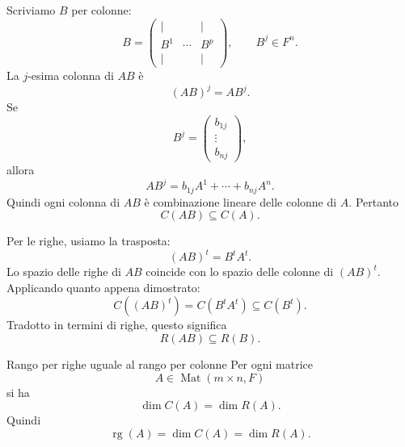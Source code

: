 \documentclass[a4paper]{article}
\begin{document}
\begin{snippetproof}{}
    Scriviamo \(B\) per colonne:
    \[
        B=
        \begin{pmatrix}
            \vert & & \vert\\
            B^1 & \cdots & B^p\\
            \vert & & \vert
        \end{pmatrix},
        \qquad
        B^j\in F^n.
    \]
    La \(j\)-esima colonna di \(AB\) è
    \[
        (AB)^j=A B^j.
    \]
    Se
    \[
        B^j=
        \begin{pmatrix}
            b_{1j}\\
            \vdots\\
            b_{nj}
        \end{pmatrix},
    \]
    allora
    \[
        AB^j
        =
        b_{1j}A^1+\cdots+b_{nj}A^n.
    \]
    Quindi ogni colonna di \(AB\) è combinazione lineare delle colonne di \(A\). Pertanto
    \[
        C(AB)\subseteq C(A).
    \]

    Per le righe, usiamo la trasposta:
    \[
        (AB)^t=B^tA^t.
    \]
    Lo spazio delle righe di \(AB\) coincide con lo spazio delle colonne di \((AB)^t\). Applicando quanto appena dimostrato:
    \[
        C((AB)^t)=C(B^tA^t)\subseteq C(B^t).
    \]
    Tradotto in termini di righe, questo significa
    \[
        R(AB)\subseteq R(B).
    \]
\end{snippetproof}

\begin{snippettheorem}{Rango per righe uguale al rango per colonne}
    Per ogni matrice
    \[
        A\in\operatorname{Mat}(m\times n,F)
    \]
    si ha
    \[
        \dim C(A)=\dim R(A).
    \]
    Quindi
    \[
        \operatorname{rg}(A)
        =
        \dim C(A)
        =
        \dim R(A).
    \]
\end{snippettheorem}
\end{document}
